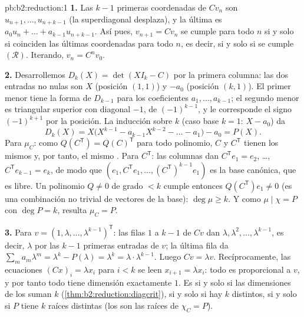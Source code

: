 \begin{solution}{pb:b2:reduction:1}
\textbf{1.} Las $k - 1$ primeras coordenadas de $Cv_n$ son
$u_{n+1}, \dots, u_{n+k-1}$ (la superdiagonal desplaza), y la
última es $a_0 u_n + \dots + a_{k-1}u_{n+k-1}$. Así pues,
$v_{n+1} = Cv_n$ se cumple para todo $n$ si y solo si coinciden
las últimas coordenadas para todo $n$, es decir, si y solo si se
cumple $(\mathcal R)$. Iterando, $v_n = C^nv_0$.

\textbf{2.} Desarrollemos $D_k(X) = \det(XI_k - C)$ por la primera
columna: las dos entradas no nulas son $X$ (posición $(1,1)$) y
$-a_0$ (posición $(k,1)$). El primer menor tiene la forma de
$D_{k-1}$ para los coeficientes $a_1, \dots, a_{k-1}$; el segundo
menor es triangular superior con diagonal $-1$, de 
$(-1)^{k-1}$, y le corresponde el signo $(-1)^{k+1}$ por la
posición. La inducción sobre $k$ (caso base $k = 1$: $X - a_0$) da
\[
D_k(X) = X\bigl(X^{k-1} - a_{k-1}X^{k-2} - \dots - a_1\bigr) -
a_0 = P(X).
\]
Para $\mu_C$: como $Q(C^{\mathsf T}) = Q(C)^{\mathsf T}$ para todo
polinomio, $C$ y $C^{\mathsf T}$ tienen los mismos  y,
por tanto, el mismo . Para $C^{\mathsf T}$: las
columnas dan $C^{\mathsf T}e_1 = e_2$, \dots, $C^{\mathsf
T}e_{k-1} = e_k$, de modo que $(e_1, C^{\mathsf T}e_1, \dots,
(C^{\mathsf T})^{k-1}e_1)$ es la base canónica, que es libre. Un
polinomio $Q \neq 0$ de grado $< k$ cumple entonces $Q(C^{\mathsf
T})e_1 \neq 0$ (es una combinación no trivial de vectores de la
base): $\deg\mu \geq k$. Y como $\mu \mid \chi = P$ con $\deg P =
k$, resulta $\mu_C = P$.

\textbf{3.} Para $v = (1, \lambda, \dots, \lambda^{k-1})^{\mathsf
T}$: las filas $1$ a $k-1$ de $Cv$ dan $\lambda, \lambda^2, \dots,
\lambda^{k-1}$, es decir, $\lambda$ por las $k - 1$ primeras
entradas de $v$; la última fila da $\sum_m a_m\lambda^m =
\lambda^k - P(\lambda) = \lambda^k = \lambda\cdot\lambda^{k-1}$.
Luego $Cv = \lambda v$. Recíprocamente, las ecuaciones $(Cx)_i =
\lambda x_i$ para $i < k$ se leen $x_{i+1} = \lambda x_i$: todo
 es proporcional a $v$, y por tanto todo
 tiene dimensión exactamente $1$. Es
 si y solo si las dimensiones de los
 suman $k$
(\cref{thm:b2:reduction:diagcrit}), si y solo si hay $k$
 distintos, si y solo si $P$ tiene $k$ raíces
distintas (los  son las raíces de $\chi_C = P$).


\end{solution}
